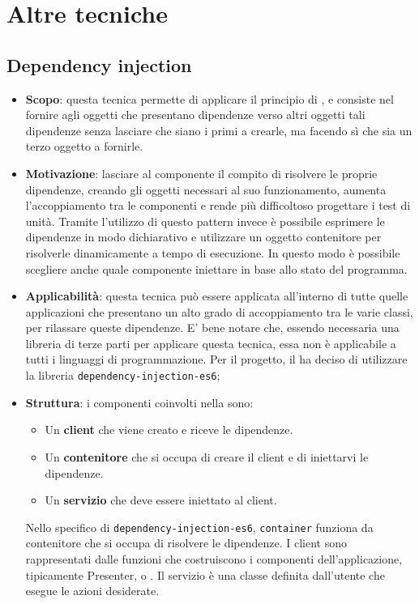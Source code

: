 \newpage
\section{Altre tecniche}
\subsection{Dependency injection}
\begin{itemize}
	\item \textbf{Scopo}: questa tecnica permette di applicare il principio di , e consiste nel fornire agli oggetti che presentano dipendenze verso altri oggetti tali dipendenze senza lasciare che siano i primi a crearle, ma facendo sì che sia un terzo oggetto a fornirle.
	\item \textbf{Motivazione}: lasciare al componente il compito di risolvere le proprie dipendenze, creando
gli oggetti necessari al suo funzionamento, aumenta l'accoppiamento tra le componenti e
rende più difficoltoso progettare i test di unità. Tramite l'utilizzo di questo pattern invece è possibile esprimere
le dipendenze in modo dichiarativo e utilizzare un oggetto contenitore per risolverle
dinamicamente a tempo di esecuzione. In questo modo è possibile scegliere anche quale componente
iniettare in base allo stato del programma.
	\item \textbf{Applicabilità}: questa tecnica può essere applicata all'interno di tutte quelle applicazioni che presentano un alto grado di accoppiamento tra le varie classi, per rilassare queste dipendenze. E' bene notare che, essendo necessaria una libreria di terze parti per applicare questa tecnica, essa non è applicabile a tutti i linguaggi di programmazione. Per il progetto, il  ha deciso di utilizzare la libreria \texttt{dependency-injection-es6};
	\item \textbf{Struttura}: i componenti coinvolti nella  sono: 
	\begin{itemize}
		\item Un \textbf{client} che viene creato e riceve le dipendenze.
		\item Un \textbf{contenitore} che si occupa di creare il client e di iniettarvi le dipendenze.
		\item Un \textbf{servizio} che deve essere iniettato al client.
	\end{itemize}
	Nello specifico di \texttt{dependency-injection-es6}, \texttt{container} funziona da contenitore che si occupa di risolvere le dipendenze. I client sono rappresentati dalle funzioni che costruiscono i componenti dell'applicazione, tipicamente Presenter,  o . Il servizio è una classe definita dall'utente che esegue le azioni desiderate. \\

\end{itemize}

